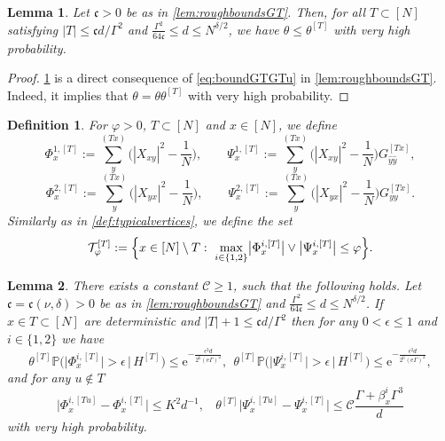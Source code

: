 \documentclass[11pt]{article}
\newcommand{\ee}{\mathrm{e}}
\newcommand{\abs}[1]{\left| #1 \right|}
\newcommand{\absn}[1]{\bigl| #1 \bigr|} %
\theoremstyle{plain}
\newtheorem{lemma}{Lemma}[section]
\newtheorem{defi}{Definition}[section]
\theoremstyle{remark}
\numberwithin{equation}{section}
\newcommand*\bset[1]{[#1]}
\newcommand*\ubarr[1]{{\widehat{#1}}}
\begin{document}
	\begin{lemma}\label{lem:corthetalethetaT}
		Let $\mathfrak c >0$ be as in \cref{lem:roughboundsGT}. Then, for all $T \subset [N]$ satisfying $\abs{T} \leq \mathfrak c d/\Gamma^2$ and $ \frac{\Gamma^2}{64 \mathfrak c} \leq d \leq N^{\delta/2}$, we have $\theta \le \theta^{\bset{T}}$ with very high probability. 
	\end{lemma}
	\begin{proof}
		\cref{lem:corthetalethetaT} is a direct consequence of \cref{eq:boundGTGTu} in \cref{lem:roughboundsGT}. Indeed, it implies that $\theta = \theta \theta^{\bset{T}}$ with very high probability.
	\end{proof}
		\begin{defi}\label{def:typicalverticesdecoupled}
		For $\varphi >0$, $T \subset [N]$ and $x \in [N]$, we define
		\begin{equation*}
			\Phi^{1,\bset{T}}_x:= \sum_{y}^{(Tx)}\bigg(|X_{xy}|^2 - \frac{1}{N}\bigg), \qquad \Psi^{1,\bset{T}}_x:=  \sum_{y}^{(Tx)}\bigg(|X_{xy}|^2 - \frac{1}{N}\bigg) G^{\bset{Tx}}_{\ubarr{y}\ubarr{y}},
		\end{equation*}
		\begin{equation*}
			\Phi^{2,\bset{T}}_x:= \sum_{y}^{(Tx)}\bigg(|X_{yx}|^2 - \frac{1}{N}\bigg),\qquad \Psi^{2,\bset{T}}_x:=  \sum_{y}^{(Tx)}\bigg(|X_{yx}|^2 - \frac{1}{N}\bigg) G^{\bset{Tx}}_{yy}.
		\end{equation*}
		Similarly as in \cref{def:typicalvertices}, we define the set
		\begin{equation*}
			\mathcal{T}^{\bset{T}}_{\varphi} := \Bigl\{ x \in [N]\setminus T :~\max_{i \in \{1,2\}}\absn{\Phi^{i,\bset{T}}_x}\vee \absn{\Psi^{i,\bset{T}}_x }\le \varphi\Bigr\}.
		\end{equation*}
	\end{defi}

	\begin{lemma}\label{lemma:conditionalpbestimates}
		There exists a constant $\mathcal{C}\ge 1$, such that the following holds. Let $\mathfrak{c} = \mathfrak{c}(\nu, \delta)>0$ be as in \cref{lem:roughboundsGT} and $ \frac{\Gamma^2}{64 \mathfrak c} \leq d \leq N^{\delta/2}$. If $x \in T \subset [N]$ are deterministic and $\abs{T} +1\le \mathfrak{c}d/\Gamma^2$ then for any $0 < \epsilon \le 1$ and $i \in \{1,2\}$ we have
		\begin{equation}\label{eq:decoupledpbcondi}
			\theta^{\bset{T}} \mathbb{P} \big( \big |\Phi_x^{i,\bset{T}}\big| > \epsilon \, \big| \, H^{\bset{T}} \big) \le \ee^{-\frac{ \epsilon^2 d}{2^6(\ee\Gamma)^2}}, ~~ \theta^{\bset{T}} \mathbb{P} \big( \big|\Psi_x^{i,\bset{T}}\big| > \epsilon \, \big| \, H^{\bset{T}} \big) \le    \ee^{-\frac{ \epsilon^2 d}{2^6(\ee\Gamma)^2}},
		\end{equation}
	and for any $u \notin T$
		\begin{equation}\label{eq:accroissementPhiPsiT}
			\big| \Phi_x^{i,\bset{Tu}} - \Phi_x^{i,\bset{T}} \big| \le K^2d^{-1},~~~~ \theta^{\bset{T}}\big|\Psi_x^{i,\bset{Tu}} - \Psi_x^{i,\bset{T}}\big| \le \mathcal{C}  \frac{\Gamma + \beta^{i}_x\Gamma^3}{d}
		\end{equation}
		with very high probability.
	\end{lemma}
\end{document}
